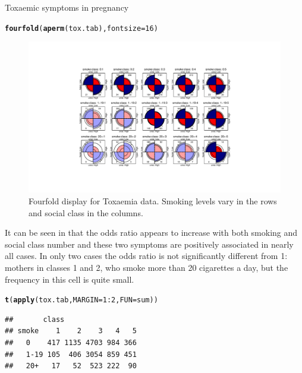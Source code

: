 \documentclass[11pt]{book}\usepackage[]{graphicx}\usepackage[]{color}
\makeatletter
\newcommand{\hlnum}[1]{\textcolor[rgb]{0.686,0.059,0.569}{#1}}%
\newcommand{\hlopt}[1]{\textcolor[rgb]{0,0,0}{#1}}%
\newcommand{\hlstd}[1]{\textcolor[rgb]{0.345,0.345,0.345}{#1}}%
\newcommand{\hlkwc}[1]{\textcolor[rgb]{0.333,0.667,0.333}{#1}}%
\newcommand{\hlkwd}[1]{\textcolor[rgb]{0.737,0.353,0.396}{\textbf{#1}}}%
\newenvironment{kframe}{%
 \def\at@end@of@kframe{}%
 \ifinner\ifhmode%
  \def\at@end@of@kframe{\end{minipage}}%
  \begin{minipage}{\columnwidth}%
 \fi\fi%
 \def\FrameCommand##1{\hskip\@totalleftmargin \hskip-\fboxsep
 \colorbox{shadecolor}{##1}\hskip-\fboxsep
     \hskip-\linewidth \hskip-\@totalleftmargin \hskip\columnwidth}%
 \MakeFramed {\advance\hsize-\width
   \@totalleftmargin\z@ \linewidth\hsize
   \@setminipage}}%
 {\par\unskip\endMakeFramed%
 \at@end@of@kframe}
\newenvironment{knitrout}{}{} %
\renewenvironment{knitrout}{\small\renewcommand{\baselinestretch}{.85}}{} %
\makeatother
\begin{document}
\begin{Example}[toxaemia]{Toxaemic symptoms in pregnancy}
\begin{knitrout}
\color{fgcolor}\begin{kframe}
\begin{alltt}
\hlkwd{fourfold}\hlstd{(}\hlkwd{aperm}\hlstd{(tox.tab),} \hlkwc{fontsize}\hlstd{=}\hlnum{16}\hlstd{)}
\end{alltt}
\end{kframe}
\end{knitrout}
\begin{figure}[!htb]
\centering
\includegraphics[width=.75\textwidth]{ch08/fig/tox-fourfold-crop}
\caption{Fourfold display for Toxaemia data. Smoking levels vary in the rows and social class in the columns.}
\label{fig:tox-fourfold}
\end{figure}

It can be seen in 
that the odds ratio appears to increase with both smoking and social class number and
these two symptoms are positively associated in nearly all cases.
In only two cases the odds ratio is not significantly different from 1:
mothers in classes 1 and 2, who smoke more than 20 cigarettes a day,
but the frequency in this cell is quite small.

\begin{knitrout}
\color{fgcolor}\begin{kframe}
\begin{alltt}
\hlkwd{t}\hlstd{(}\hlkwd{apply}\hlstd{(tox.tab,} \hlkwc{MARGIN}\hlstd{=}\hlnum{1}\hlopt{:}\hlnum{2}\hlstd{,} \hlkwc{FUN}\hlstd{=sum))}
\end{alltt}
\begin{verbatim}
##       class
## smoke    1    2    3   4   5
##   0    417 1135 4703 984 366
##   1-19 105  406 3054 859 451
##   20+   17   52  523 222  90
\end{verbatim}
\end{kframe}
\end{knitrout}


\end{Example}
\end{document}
